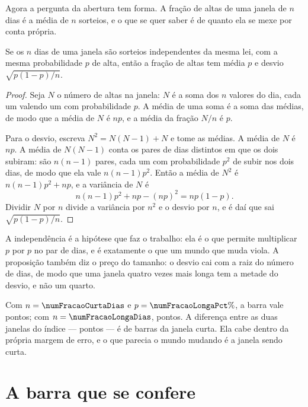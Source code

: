 Agora a pergunta da abertura tem forma. A fração de altas de uma janela de $n$ dias é a média
de $n$ sorteios, e o que se quer saber é de quanto ela se mexe por conta própria.

\begin{proposicao}\label{prop:barra}
Se os $n$ dias de uma janela são sorteios independentes da mesma lei, com a mesma probabilidade
$p$ de alta, então a fração de altas tem média $p$ e desvio
$\sqrt{p(1-p)/n}$.
\end{proposicao}

\begin{proof}
Seja $N$ o número de altas na janela: $N$ é a soma dos $n$ valores do dia, cada um valendo um
com probabilidade $p$. A média de uma soma é a soma das médias, de modo que a média de $N$ é
$np$, e a média da fração $N/n$ é $p$.

Para o desvio, escreva $N^2 = N(N-1) + N$ e tome as médias. A média de $N$ é $np$. A média de
$N(N-1)$ conta os pares de dias distintos em que os dois subiram: são $n(n-1)$ pares, cada um
com probabilidade $p^2$ de subir nos dois dias, de modo que ela vale $n(n-1)p^2$. Então a média
de $N^2$ é $n(n-1)p^2 + np$, e a variância de $N$ é
\[
  n(n-1)p^2 + np - (np)^2 = np(1-p).
\]
Dividir $N$ por $n$ divide a variância por $n^2$ e o desvio por $n$, e é daí que sai
$\sqrt{p(1-p)/n}$.
\end{proof}

A independência é a hipótese que faz o trabalho: ela é o que permite multiplicar $p$ por $p$ no
par de dias, e é exatamente o que um mundo que muda viola. A proposição também diz o preço do
tamanho: o desvio cai com a raiz do número de dias, de modo que uma janela quatro vezes mais
longa tem a metade do desvio, e não um quarto.

Com $n = \numFracaoCurtaDias$ e $p = \numFracaoLongaPct\%$, a barra vale
\numBarraCurtaPct{} pontos; com $n = \numFracaoLongaDias$, \numBarraLongaPct{} pontos. A
diferença entre as duas janelas do índice --- \numFracaoDiferencaPct{} pontos --- é de
\numFracaoDiferencaBarras{} barras da janela curta. Ela cabe dentro da própria margem de erro,
e o que parecia o mundo mudando é a janela sendo curta.

\section{A barra que se confere}

